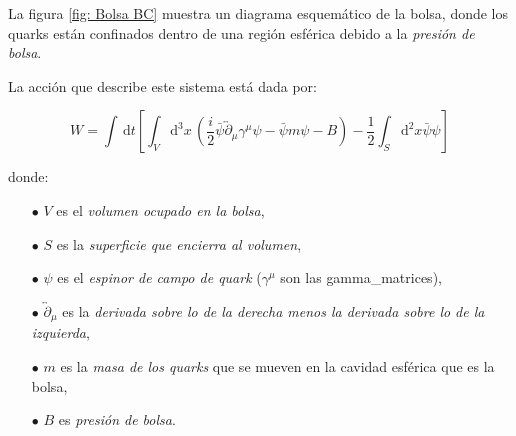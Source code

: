 La figura \ref{fig: Bolsa BC} muestra un diagrama esquemático de la bolsa, donde los quarks están confinados dentro de una región esférica debido a la \emph{presión de bolsa}.

La acción que describe este sistema está dada por:

\begin{equation}\label{eq-action}
W = \int \, \mathrm{d}t \left[ \int_{V} \mathrm{d}^{3} x \, \left( \frac{i}{2} \bar{\psi} \overleftrightarrow{\partial}_{\mu} {\gamma}^{\mu} \psi - \bar{\psi} m \psi - B \right) - \frac{1}{2} \int_{S} \mathrm{d}^{2} x \bar{\psi} \psi\right]
\end{equation}

donde:
\begin{itemize}
    \item[$\bullet$] $V$ es el \emph{volumen ocupado en la bolsa},
    \item[$\bullet$] $S$ es la \emph{superficie que encierra al volumen},
    \item[$\bullet$] $\psi$ es el \emph{espinor de campo de quark} (${\gamma}^{\mu}$ son las \gls{gamma_matrices}),
    \item[$\bullet$] $\overleftrightarrow{\partial}_{\mu}$ es la \emph{derivada sobre lo de la derecha menos la derivada sobre lo de la izquierda},
    \item[$\bullet$] $m$ es la \emph{masa de los quarks} que se mueven en la cavidad esférica que es la bolsa,
    \item[$\bullet$] $B$ es \emph{presión de bolsa}.
\end{itemize}


